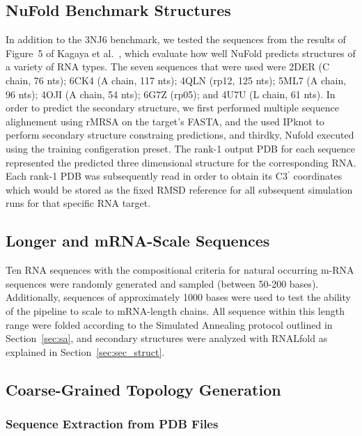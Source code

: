 \subsection{NuFold Benchmark Structures}
\label{sec:nufold}

In addition to the 3NJ6 benchmark, we tested the sequences from the results of Figure~5 of Kagaya et al.~\cite{Kagaya2025}, which evaluate how well NuFold predicts structures of a variety of RNA types. The seven sequences that were used were 2DER (C chain, 76 nts); 6CK4 (A chain, 117 nts); 4QLN (rp12, 125 nts); 5ML7 (A chain, 96 nts); 4OJI (A chain, 54 nts); 6G7Z (rp05); and 4U7U (L chain, 61 nts). 
In order to predict the secondary structure, we first performed multiple sequence alighnement using rMRSA on the target's FASTA, and the used IPknot to perform secondary structure constraing predictions, and thirdky, Nufold executed using the training configeration preset. The rank-1 output PDB for each sequence represented the predicted three dimensional structure for the corresponding RNA. Each rank-1 PDB was subsequently read in order to obtain its C3$^\prime$ coordinates which would be stored as the fixed RMSD reference for all subsequent simulation runs for that specific RNA target.


\subsection{Longer and mRNA-Scale Sequences}
\label{sec:longer_seqs}

Ten RNA sequences with the compositional criteria for natural occurring m-RNA sequences were randomly generated and sampled (between 50-200 bases). Additionally, sequences of approximately 1000 bases were used to test the ability of the pipeline to scale to mRNA-length chains. All sequence within this length range were folded according to the Simulated Annealing protocol outlined in Section~\ref{sec:sa}, and secondary structures were analyzed with RNALfold as explained in Section~\ref{sec:sec_struct}.

\subsection{Coarse-Grained Topology Generation}
\label{sec:topology}

\subsubsection{Sequence Extraction from PDB Files}

